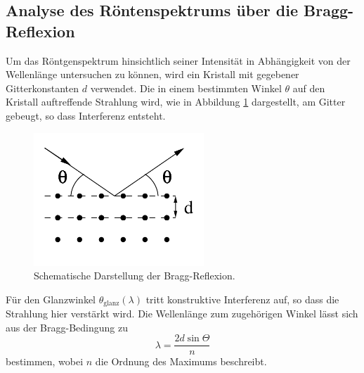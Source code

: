 \subsection{Analyse des Röntenspektrums über die Bragg-Reflexion}
Um das Röntgenspektrum hinsichtlich seiner Intensität in Abhängigkeit von der Wellenlänge untersuchen zu können, wird ein Kristall mit gegebener Gitterkonstanten $d$ verwendet.
Die in einem bestimmten Winkel $\theta$ auf den Kristall auftreffende Strahlung wird, wie in Abbildung \ref{abb:2} dargestellt, am Gitter gebeugt, so dass Interferenz entsteht.
\begin{figure}[H]
  \centering
  \includegraphics[height=5cm]{ressources/bragg.png}
  \caption{Schematische Darstellung der Bragg-Reflexion.\cite{skript}}
  \label{abb:2}
\end{figure}
Für den Glanzwinkel $\theta_{\text{glanz}}(\lambda)$ tritt konstruktive Interferenz auf, so dass die Strahlung hier verstärkt wird.
Die Wellenlänge zum zugehörigen Winkel lässt sich aus der Bragg-Bedingung zu
\begin{equation}
  \lambda = \frac{2 d \sin{\Theta}}{n}
\end{equation}
bestimmen, wobei $n$ die Ordnung des Maximums beschreibt.
